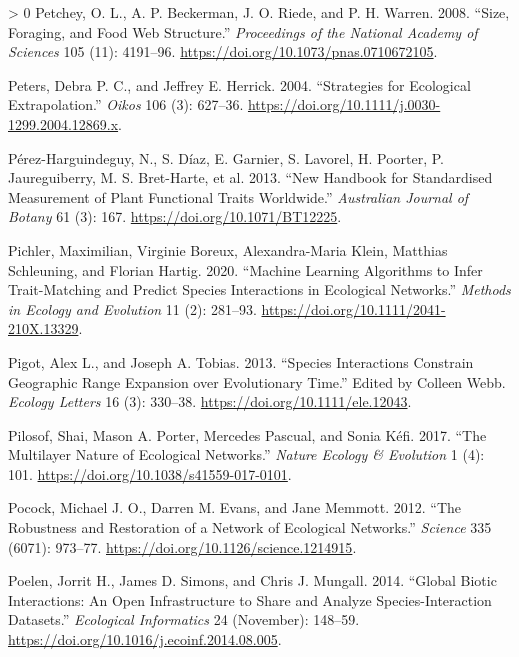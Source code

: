 \documentclass[11pt]{article}
\newlength{\cslhangindent}
\newenvironment{CSLReferences}[3] %
 {%
  \setlength{\parindent}{0pt}
  \ifodd #1 \everypar{\setlength{\hangindent}{\cslhangindent}}\ignorespaces\fi
  \ifnum #2 > 0
  \setlength{\parskip}{#2\baselineskip}
  \fi
 }%
 {}
\begin{document}
\begin{CSLReferences}{1}{0}
\leavevmode\hypertarget{ref-Petchey2008SizFor}{}%
Petchey, O. L., A. P. Beckerman, J. O. Riede, and P. H. Warren. 2008.
{``Size, Foraging, and Food Web Structure.''} \emph{Proceedings of the
National Academy of Sciences} 105 (11): 4191--96.
\url{https://doi.org/10.1073/pnas.0710672105}.

\leavevmode\hypertarget{ref-Peters2004StrEco}{}%
Peters, Debra P. C., and Jeffrey E. Herrick. 2004. {``Strategies for
Ecological Extrapolation.''} \emph{Oikos} 106 (3): 627--36.
\url{https://doi.org/10.1111/j.0030-1299.2004.12869.x}.

\leavevmode\hypertarget{ref-Perez-Harguindeguy2013NewHan}{}%
Pérez-Harguindeguy, N., S. Díaz, E. Garnier, S. Lavorel, H. Poorter, P.
Jaureguiberry, M. S. Bret-Harte, et al. 2013. {``New Handbook for
Standardised Measurement of Plant Functional Traits Worldwide.''}
\emph{Australian Journal of Botany} 61 (3): 167.
\url{https://doi.org/10.1071/BT12225}.

\leavevmode\hypertarget{ref-Pichler2020MacLea}{}%
Pichler, Maximilian, Virginie Boreux, Alexandra-Maria Klein, Matthias
Schleuning, and Florian Hartig. 2020. {``Machine Learning Algorithms to
Infer Trait-Matching and Predict Species Interactions in Ecological
Networks.''} \emph{Methods in Ecology and Evolution} 11 (2): 281--93.
\url{https://doi.org/10.1111/2041-210X.13329}.

\leavevmode\hypertarget{ref-Pigot2013SpeInt}{}%
Pigot, Alex L., and Joseph A. Tobias. 2013. {``Species Interactions
Constrain Geographic Range Expansion over Evolutionary Time.''} Edited
by Colleen Webb. \emph{Ecology Letters} 16 (3): 330--38.
\url{https://doi.org/10.1111/ele.12043}.

\leavevmode\hypertarget{ref-Pilosof2017MulNat}{}%
Pilosof, Shai, Mason A. Porter, Mercedes Pascual, and Sonia Kéfi. 2017.
{``The Multilayer Nature of Ecological Networks.''} \emph{Nature Ecology
\& Evolution} 1 (4): 101. \url{https://doi.org/10.1038/s41559-017-0101}.

\leavevmode\hypertarget{ref-Pocock2012RobRes}{}%
Pocock, Michael J. O., Darren M. Evans, and Jane Memmott. 2012. {``The
Robustness and Restoration of a Network of Ecological Networks.''}
\emph{Science} 335 (6071): 973--77.
\url{https://doi.org/10.1126/science.1214915}.

\leavevmode\hypertarget{ref-Poelen2014GloBio}{}%
Poelen, Jorrit H., James D. Simons, and Chris J. Mungall. 2014.
{``Global Biotic Interactions: An Open Infrastructure to Share and
Analyze Species-Interaction Datasets.''} \emph{Ecological Informatics}
24 (November): 148--59.
\url{https://doi.org/10.1016/j.ecoinf.2014.08.005}.


\end{CSLReferences}
\end{document}
